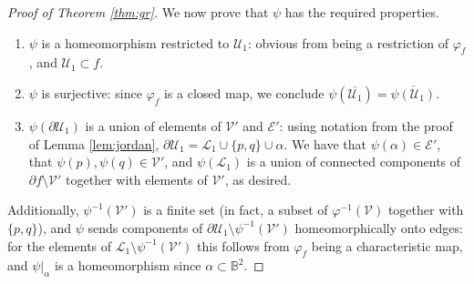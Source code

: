 \documentclass[11pt,reqno]{amsart}
\theoremstyle{plain}
\theoremstyle{definition}
\theoremstyle{remark}
\numberwithin{equation}{subsection}
\newcommand*{\bbB}{\mathbb{B}}
\newcommand*{\bbD}{\mathbb{D}}
\newcommand*{\calC}{\mathcal{C}}
\newcommand*{\calD}{\mathcal{D}}
\newcommand*{\calE}{\mathcal{E}}
\newcommand*{\calF}{\mathcal{F}}
\newcommand*{\calL}{\mathcal{L}}
\newcommand*{\calU}{\mathcal{U}}
\newcommand*{\calV}{\mathcal{V}}
\DeclareMathOperator{\gr}{gr}
\begin{document}
\begin{proof}[Proof of Theorem \ref{thm:gr}]
    We now prove that $\psi$ has the required properties.
    \begin{enumerate}
        \item $\psi$ is a homeomorphism restricted to $\calU_1$: obvious from being a restriction of $\varphi_f$, and $\calU_1\subset f$.
        \item $\psi$ is surjective: since $\varphi_f$ is a closed map, we conclude $\psi(\overline{\calU_1})=\overline{\psi(\calU_1)}$.
        \item $\psi(\partial\calU_1)$ is a union of elements of $\calV'$ and $\calE'$: using notation from the proof of Lemma \ref{lem:jordan}, $\partial\calU_1=\calL_1\cup\{p,q\}\cup\alpha$. We have that $\psi(\alpha)\in\calE'$, that $\psi(p),\psi(q)\in\calV'$, and $\psi(\calL_1)$ is a union of connected components of $\partial f\setminus\calV'$ together with elements of $\calV'$, as desired.
    \end{enumerate}
    Additionally, $\psi^{-1}(\calV')$ is a finite set (in fact, a subset of $\varphi^{-1}(\calV)$ together with $\{p,q\}$), and $\psi$ sends components of $\partial\calU_1\setminus\psi^{-1}(\calV')$ homeomorphically onto edges: for the elements of $\calL_1\setminus\psi^{-1}(\calV')$ this follows from $\varphi_f$ being a characteristic map, and $\psi|_{\alpha}$ is a homeomorphism since $\alpha\subset\bbB^2$.
\end{proof}

\end{document}
